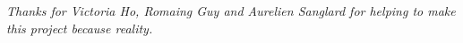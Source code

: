 \clearpage
\thispagestyle{empty}
\vspace*{\fill}
\begin{center}
\begin{minipage}{.6\textwidth}
\emph{Thanks for Victoria Ho, Romaing Guy and Aurelien Sanglard for helping to make this project because reality.\\}
\end{minipage}
\end{center}
\vfill %
\clearpage
